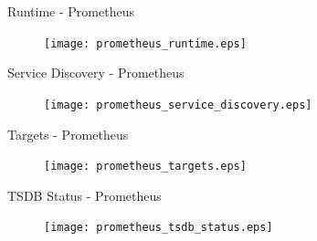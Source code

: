 
\begin{frame}[fragile]{Runtime - Prometheus}

\begin{figure}
\begin{center}
\texttt{[image: prometheus\_runtime.eps]}
\end{center}
\end{figure}

\end{frame}


\begin{frame}[fragile]{Service Discovery - Prometheus}

\begin{figure}
\begin{center}
\texttt{[image: prometheus\_service\_discovery.eps]}
\end{center}
\end{figure}

\end{frame}


\begin{frame}[fragile]{Targets - Prometheus}

\begin{figure}
\begin{center}
\texttt{[image: prometheus\_targets.eps]}
\end{center}
\end{figure}

\end{frame}


\begin{frame}[fragile]{TSDB Status - Prometheus}

\begin{figure}
\begin{center}
\texttt{[image: prometheus\_tsdb\_status.eps]}
\end{center}
\end{figure}

\end{frame}


